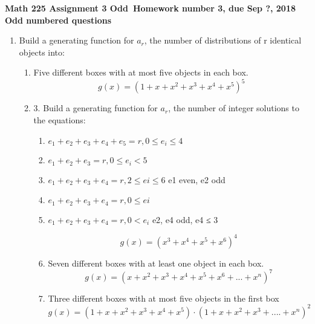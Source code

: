 \documentclass[12pt]{amsart}
\begin{document}
\begin{center}
  \bfseries
  Math 225 Assignment 3 Odd\
  Homework number 3, due Sep ?, 2018\\
  Odd numbered questions
\end{center}

\bigskip

\begin{enumerate}
\item Build a generating function for ${a_r}$, the number of distributions of r identical
objects into:
\begin{enumerate}
 \item Five different boxes with at most five objects in each box.
\begin{displaymath}
g(x) =(1+x+x^2+x^3+x^4+x^5)^5
\end{displaymath}

\bigskip

  \item 3. Build a generating function for ${a_r}$, the number of integer solutions to the equations:
\begin{enumerate}
\item ${e_1 + e_2 + e_3 + e_4 + e_5 = r, 0 ≤ e_i ≤ 4}$
\item ${e_1 + e_2 + e_3  = r, 0 ≤ e_i< 5}$
\item ${e_1 + e_2 + e_3 +e_4 = r, 2 ≤ ei ≤ 6}$ e1 even, e2 odd
\item ${e_1 + e_2 + e_3 +e_4 = r, 0 ≤ ei}$
\item ${e_1 + e_2 + e_3 +e_4 = r, 0 < e_i}$ e2, e4 odd, e4 ≤ 3

\begin{displaymath}
g(x) =(x^3+x^4+x^5+x^6)^4
\end{displaymath}

\item Seven different boxes with at least one object in each box.
\begin{displaymath}
g(x) =(x+x^2+x^3+x^4+x^5+x^6+...+x^n)^7
\end{displaymath}

\item Three different boxes with at most five objects in the first box  
\begin{displaymath}
g(x) =(1+x+x^2+x^3+x^4+x^5)\cdot(1+x+x^2+x^3+....+x^n)^2
\end{displaymath}

  \end{enumerate}
  



\end{enumerate}
\end{enumerate}
\end{document}
